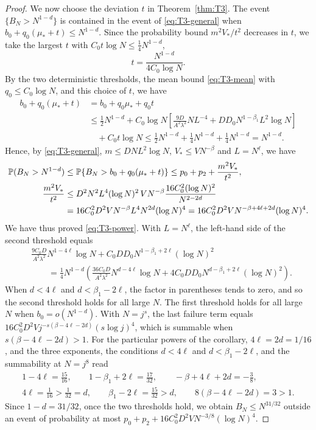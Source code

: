 \begin{proof}
We now choose the deviation $t$ in Theorem~\ref{thm:T3}. The
event $\{B_N>N^{1-d}\}$ is contained in the event of
\eqref{eq:T3-general} when $b_0+q_0(\mu_*+t)\leq N^{1-d}$. Since the
probability bound $m^2V_*/t^2$ decreases in $t$, we take the largest $t$
with $C_0t\log N\leq\frac14N^{1-d}$,
\[
 t=\frac{N^{1-d}}{4C_0\log N}.
\]
By the two deterministic thresholds, the mean bound \eqref{eq:T3-mean}
with $q_0\leq C_0\log N$, and this choice of $t$, we have
\begin{align*}
 b_0+q_0(\mu_*+t)
 &=b_0+q_0\mu_*+q_0t\\
 &\leq\frac12N^{1-d}
   +C_0\log N\left[\frac{9D}{A^2\lambda^2}NL^{-4}
           +DD_0N^{1-\beta_1}L^2\log N\right]\\
 &\quad+C_0t\log N
 \leq\frac12N^{1-d}+\frac14N^{1-d}+\frac14N^{1-d}
 =N^{1-d}.
\end{align*}
Hence, by \eqref{eq:T3-general}, $m\leq DNL^2\log N$,
$V_*\leq VN^{-\beta}$ and $L=N^\ell$, we have
\begin{align*}
 \mathbb P(B_N>N^{1-d})
 &\leq\mathbb P\{B_N>b_0+q_0(\mu_*+t)\}
 \leq p_0+p_2+\frac{m^2V_*}{t^2},\\
 \frac{m^2V_*}{t^2}
 &\leq D^2N^2L^4(\log N)^2\,VN^{-\beta}
           \frac{16C_0^2(\log N)^2}{N^{2-2d}}\\
 &=16C_0^2D^2VN^{-\beta}L^4N^{2d}(\log N)^4
 =16C_0^2D^2V N^{-\beta+4\ell+2d}(\log N)^4.
\end{align*}
We have thus proved \eqref{eq:T3-power}.
With $L=N^\ell$, the left-hand side of the second threshold equals
\begin{align*}
 &\frac{9C_0D}{A^2\lambda^2}N^{1-4\ell}\log N
 +C_0DD_0N^{1-\beta_1+2\ell}(\log N)^2\\
 &\qquad=\frac14N^{1-d}\left(\frac{36C_0D}{A^2\lambda^2}N^{d-4\ell}\log N
 +4C_0DD_0N^{d-\beta_1+2\ell}(\log N)^2\right).
\end{align*}
When $d<4\ell$ and $d<\beta_1-2\ell$, the factor in parentheses tends to
zero, and so the second threshold holds for all large $N$. The first
threshold holds for all large $N$ when $b_0=o(N^{1-d})$. With $N=j^s$,
the last failure term equals
$16C_0^2D^2Vj^{-s(\beta-4\ell-2d)}(s\log j)^4$, which is summable when
$s(\beta-4\ell-2d)>1$.
For the particular powers of the corollary, $4\ell=2d=1/16$, and the
three exponents, the conditions $d<4\ell$ and $d<\beta_1-2\ell$, and the
summability at $N=j^8$ read
\begin{gather*}
 1-4\ell=\frac{15}{16},\qquad
 1-\beta_1+2\ell=\frac{17}{32},\qquad
 -\beta+4\ell+2d=-\frac38,\\
 4\ell=\frac1{16}>\frac1{32}=d,\qquad
 \beta_1-2\ell=\frac{15}{32}>d,\qquad
 8(\beta-4\ell-2d)=3>1.
\end{gather*}
Since $1-d=31/32$, once the two thresholds hold, we obtain
$B_N\leq N^{31/32}$ outside an event of probability at most
$p_0+p_2+16C_0^2D^2VN^{-3/8}(\log N)^4$.
\end{proof}

